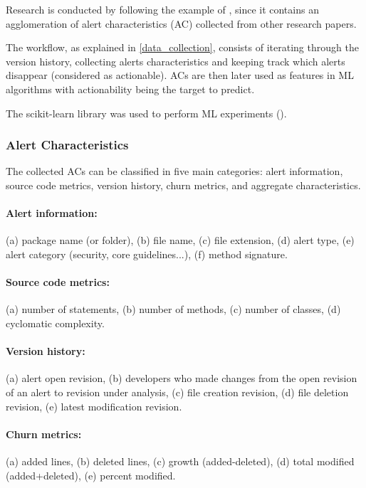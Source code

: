 Research is conducted by following the example of \cite{model_building_actionable}, since it contains an agglomeration of alert characteristics (AC) collected from other research papers.

The workflow, as explained in \cref{data_collection}, consists of iterating through the version history, collecting alerts characteristics and keeping track which alerts disappear (considered as actionable). ACs are then later used as features in ML algorithms with actionability being the target to predict.

The scikit-learn library was used to perform ML experiments (\cite{scikit-learn}).

\subsubsection{Alert Characteristics}

The collected ACs can be classified in five main categories: alert information, source code metrics, version history, churn metrics, and aggregate characteristics.

\paragraph{Alert information:} (a) package name (or folder), (b) file name, (c) file extension, (d) alert type, (e) alert category (security, core guidelines...), (f) method signature.

\paragraph{Source code metrics:} (a) number of statements, (b) number of methods, (c) number of classes, (d) cyclomatic complexity.

\paragraph{Version history:} (a) alert open revision, (b) developers who made changes from the open revision of an alert to revision under analysis, (c) file creation revision, (d) file deletion revision, (e) latest modification revision.

\paragraph{Churn metrics:} (a) added lines, (b) deleted lines, (c) growth (added-deleted), (d) total modified (added+deleted), (e) percent modified.

